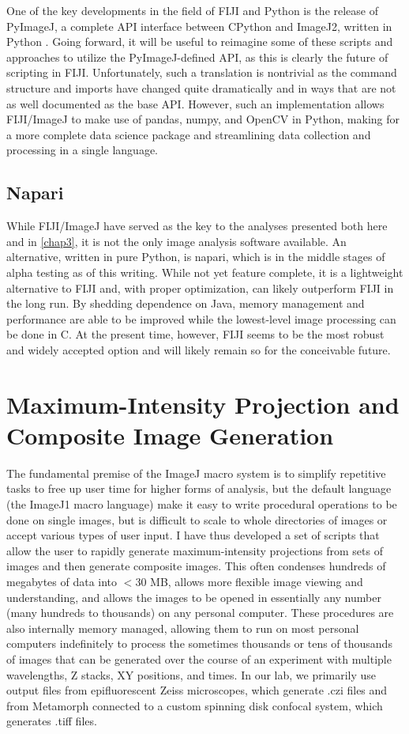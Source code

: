 One of the key developments in the field of FIJI and Python is the release of PyImageJ, a complete API interface between CPython and ImageJ2, written in Python \citep{Rueden2022}. Going forward, it will be useful to reimagine some of these scripts and approaches to utilize the PyImageJ-defined API, as this is clearly the future of scripting in FIJI. Unfortunately, such a translation is nontrivial as the command structure and imports have changed quite dramatically and in ways that are not as well documented as the base API. However, such an implementation allows FIJI/ImageJ to make use of pandas, numpy, and OpenCV in Python, making for a more complete data science package and streamlining data collection and processing in a single language. 

\subsection{Napari}

While FIJI/ImageJ have served as the key to the analyses presented both here and in \autoref{chap3}, it is not the only image analysis software available. An alternative, written in pure Python, is napari, which is in the middle stages of alpha testing as of this writing. While not yet feature complete, it is a lightweight alternative to FIJI and, with proper optimization, can likely outperform FIJI in the long run. By shedding dependence on Java, memory management and performance are able to be improved while the lowest-level image processing can be done in C. At the present time, however, FIJI seems to be the most robust and widely accepted option and will likely remain so for the conceivable future.

\section{Maximum-Intensity Projection and Composite Image Generation}

The fundamental premise of the ImageJ macro system is to simplify repetitive tasks to free up user time for higher forms of analysis, but the default language (the ImageJ1 macro language) make it easy to write procedural operations to be done on single images, but is difficult to scale to whole directories of images or accept various types of user input. I have thus developed a set of scripts that allow the user to rapidly generate maximum-intensity projections from sets of images and then generate composite images. This often condenses hundreds of megabytes of data into $<$30 MB, allows more flexible image viewing and understanding, and allows the images to be opened in essentially any number (many hundreds to thousands) on any personal computer. These procedures are also internally memory managed, allowing them to run on most personal computers indefinitely to process the sometimes thousands or tens of thousands of images that can be generated over the course of an experiment with multiple wavelengths, Z stacks, XY positions, and times. In our lab, we primarily use output files from epifluorescent Zeiss microscopes, which generate .czi files and from Metamorph connected to a custom spinning disk confocal system, which generates .tiff files.

